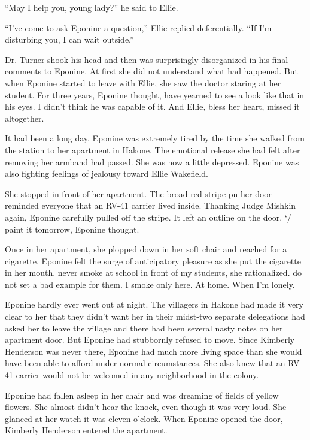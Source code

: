 \documentclass[]{article}
\begin{document}
{“May I help you, young lady?” he said to Ellie.

“I’ve come to ask Eponine a question,” Ellie replied deferentially.  “If I’m disturbing you, I can wait outside.”

Dr.  Turner shook his head and then was surprisingly disorganized in his final comments to Eponine.  At first she did not understand what had happened.  But when Eponine started to leave with Ellie, she saw the doctor staring at her student.  For three years, Eponine thought, have yearned to see a look like that in his eyes.  I didn’t think he was capable of it.  And Ellie, bless her heart, missed it altogether.

It had been a long day.  Eponine was extremely tired by the time she walked from the station to her apartment in Hakone.  The emotional release she had felt after removing her armband had passed.  She was now a little depressed.  Eponine was also fighting feelings of jealousy toward Ellie Wakefield.

She stopped in front of her apartment.  The broad red stripe pn her door reminded everyone that an RV-41 carrier lived inside.  Thanking Judge Mishkin again, Eponine carefully pulled off the stripe.  It left an outline on the door.  ‘/ paint it tomorrow, Eponine thought.

Once in her apartment, she plopped down in her soft chair and reached for a cigarette.  Eponine felt the surge of anticipatory pleasure as she put the cigarette in her mouth.  never smoke at school in front of my students, she rationalized.  do not set a bad example for them.  I smoke only here.  At home.  When I’m lonely.

Eponine hardly ever went out at night.  The villagers in Hakone had made it very clear to her that they didn’t want her in their midst-two separate delegations had asked her to leave the village and there had been several nasty notes on her apartment door.  But Eponine had stubbornly refused to move.  Since Kimberly Henderson was never there, Eponine had much more living space than she would have been able to afford under normal circumstances.  She also knew that an RV-41 carrier would not be welcomed in any neighborhood in the colony.

Eponine had fallen asleep in her chair and was dreaming of fields of yellow flowers.  She almost didn’t hear the knock, even though it was very loud.  She glanced at her watch-it was eleven o’clock.  When Eponine opened the door, Kimberly Henderson entered the apartment.

}
\end{document}
